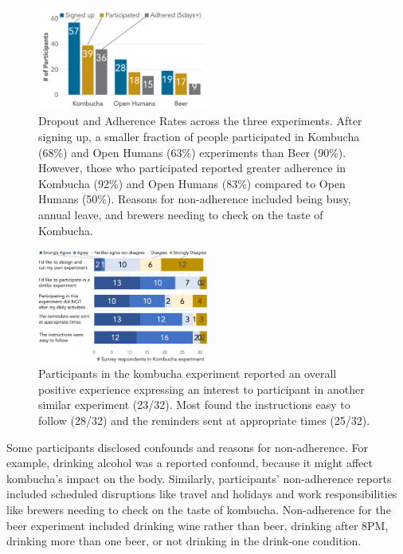 \begin{figure}[h] 
\centering
  \includegraphics[width=0.5\textwidth]{figures/galileo/galileo-study3-1}
  \caption[Dropout and Adherence Rates across the three experiments]
{Dropout and Adherence Rates across the three experiments. After signing up, a smaller fraction of people participated in Kombucha (68\%) and Open Humans (63\%) experiments than Beer (90\%). However, those who participated reported greater adherence in Kombucha (92\%) and Open Humans (83\%) compared to Open Humans (50\%). Reasons for non-adherence included being busy, annual leave, and brewers needing to check on the taste of Kombucha. }
  \label{fig:galileo-result3-1}
\end{figure}

\begin{figure}[h] 
\centering
  \includegraphics[width=0.5\textwidth]{figures/galileo/galileo-study3-2}
  \caption[Participants in the kombucha experiment reported an overall positive experience]
{Participants in the kombucha experiment reported an overall positive experience expressing an interest to participant in another similar experiment (23/32). Most found the instructions easy to follow (28/32) and the reminders sent at appropriate times (25/32). }
  \label{fig:galileo-result3-2}
\end{figure}

Some participants disclosed confounds and reasons for non-adherence. For example, drinking alcohol was a reported confound, because it might affect kombucha's impact on the body. Similarly, participants' non-adherence reports included scheduled disruptions like travel and holidays and work responsibilities like brewers needing to check on the taste of kombucha. Non-adherence for the beer experiment included drinking wine rather than beer, drinking after 8PM, drinking more than one beer, or not drinking in the drink-one condition.

